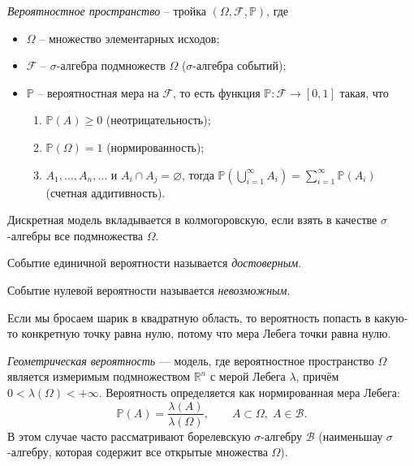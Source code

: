 \documentclass[12pt,a4paper]{article}
\begin{document}
\begin{definition}
    \textit{Вероятностное пространство} -- тройка $\left( \Omega, \mathcal{F}, \mathbb{P} \right)$, где \begin{itemize}
        \item $\Omega$ -- множество элементарных исходов;
        \item $\mathcal{F}$ -- $\sigma$-алгебра подмножеств $\Omega$ ($\sigma$-алгебра событий);
        \item $\mathbb{P}$ -- вероятностная мера на $\mathcal{F}$, то есть функция $\mathbb{P} : \mathcal{F} \to [0, 1]$ такая, что \begin{enumerate}
        \item $\mathbb{P}(A) \geq 0$ (неотрицательность);
        \item $\mathbb{P}(\Omega) = 1$ (нормированность);
        \item $A_1, \ldots, A_n, \ldots \text{ и } A_i \cap A_j = \varnothing$, тогда $\mathbb{P}\left( \bigcup\limits_{i = 1}^{\infty} A_i \right) = \sum\limits_{i=1}^{\infty} \mathbb{P}(A_i)$ (счетная аддитивность).
    \end{enumerate}
    \end{itemize} 
\end{definition}

\begin{remark}
    Дискретная модель вкладывается в колмогоровскую, если взять в качестве $\sigma$-алгебры все подмножества $\Omega$.
\end{remark}

\begin{definition}
    Событие единичной вероятности называется \textit{достоверным}.
\end{definition}

\begin{definition}
    Событие нулевой вероятности называется \textit{невозможным}.
\end{definition}

\begin{example}
    Если мы бросаем шарик в квадратную область, то вероятность попасть в какую-то конкретную точку равна нулю, потому что мера Лебега точки равна нулю.
\end{example}

\begin{definition}
    \textit{Геометрическая вероятность} — модель, где вероятностное пространство $\Omega$ является измеримым подмножеством $\mathbb{R}^n$ с мерой Лебега $\lambda$, причём $0 < \lambda(\Omega) < +\infty$. Вероятность определяется как нормированная мера Лебега: $$\mathbb{P}(A) = \frac{\lambda(A)}{\lambda(\Omega)}, \qquad A \subset \Omega, \; A \in \mathcal{B}.$$ В этом случае часто рассматривают борелевскую $\sigma$-алгебру $\mathcal{B}$ (наименьшау $\sigma$-алгебру, которая содержит все открытые множества $\Omega$). 
\end{definition}
\end{document}
